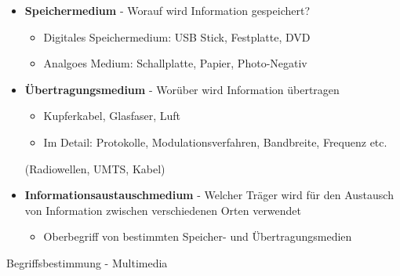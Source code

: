   \begin{bsslide}
    \begin{itemize}
      \item \textbf{Speichermedium} - Worauf wird Information gespeichert?
      \begin{itemize}
        \item Digitales Speichermedium: USB Stick, Festplatte, DVD
        \item Analgoes Medium:  Schallplatte, Papier, Photo-Negativ
      \end{itemize}
      \item \textbf{\"Ubertragungsmedium} - Wor\"uber wird Information \"ubertragen
      \begin{itemize}
        \item Kupferkabel, Glasfaser, Luft 
        \item Im Detail: Protokolle, Modulationsverfahren, Bandbreite, Frequenz etc.
      \end{itemize}(Radiowellen, UMTS, Kabel)
      \item \textbf{Informationsaustauschmedium} - Welcher Tr\"ager wird f\"ur den Austausch von Information zwischen verschiedenen Orten verwendet
      \begin{itemize}
        \item Oberbegriff von bestimmten Speicher- und \"Ubertragungsmedien
      \end{itemize}
    \end{itemize}
  \end{bsslide}

 \begin{bsslide}
  \end{bsslide}

\renewcommand{\textbufferB}{Begriffsbestimmung - Multimedia}
\begin{bsslide}
  \begin{center}
 \vspace{0.4\textheight}
    \large\textbufferB
  \end{center}
\end{bsslide}



